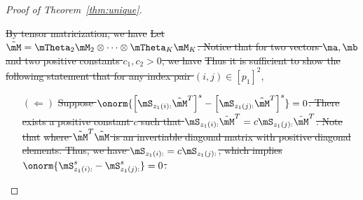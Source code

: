 \documentclass[lettersize,onecolumn,journal]{IEEEtran}
\theoremstyle{definition}
\theoremstyle{definition}
\newcommand{\of}[1]{\left(#1\right)}
\newcommand{\off}[1]{\left[#1\right]}
\providecommand{\DIFdeltex}[1]{{\protect\color{red}\sout{#1}}}                      %
\providecommand{\DIFdelbegin}{} %
\providecommand{\DIFdelend}{} %
\providecommand{\DIFdel}[1]{\texorpdfstring{\DIFdeltex{#1}}{}} %
\newcommand{\DIFscaledelfig}{0.5}
\newlength{\DIFdelgraphicswidth} %
\newlength{\DIFdelgraphicsheight} %
\newcommand{\DIFdelincludegraphics}[2][]{%
\sbox{\DIFdelgraphicsbox}{\DIFOincludegraphics[#1]{#2}}%
\settoboxwidth{\DIFdelgraphicswidth}{\DIFdelgraphicsbox} %
\settoboxtotalheight{\DIFdelgraphicsheight}{\DIFdelgraphicsbox} %
\scalebox{\DIFscaledelfig}{%
\parbox[b]{\DIFdelgraphicswidth}{\usebox{\DIFdelgraphicsbox}\\[-\baselineskip] \rule{\DIFdelgraphicswidth}{0em}}\llap{\resizebox{\DIFdelgraphicswidth}{\DIFdelgraphicsheight}{%
\setlength{\unitlength}{\DIFdelgraphicswidth}%
\begin{picture}(1,1)%
\thicklines\linethickness{2pt} %
{\color[rgb]{1,0,0}\put(0,0){\framebox(1,1){}}}%
{\color[rgb]{1,0,0}\put(0,0){\line( 1,1){1}}}%
{\color[rgb]{1,0,0}\put(0,1){\line(1,-1){1}}}%
\end{picture}%
}\hspace*{3pt}}} %
} %
\DeclareRobustCommand{\DIFdelbegin}{\DIFOdelbegin \let\includegraphics\DIFdelincludegraphics} %
\DeclareRobustCommand{\DIFdelend}{\DIFOaddend \let\includegraphics\DIFOincludegraphics} %
\begin{document}
\begin{proof}[Proof of Theorem~\ref{thm:unique}]
\begin{enumerate}[wide]
\DIFdel{By tensor matricization, we have
}%
\DIFdel{Let $\tilde \mM = \mTheta_2 \mM_2 \otimes \cdots \otimes \mTheta_K \mM_K$. Notice that for two vectors $\ma, \mb$ and two positive constants $c_1, c_2 >0$, we have
}%
\DIFdel{Thus it is sufficient to show the following statement that for any index pair $(i,j)\in[p_1]^2$}\DIFdelend ,\DIFdelbegin %
\begin{enumerate}%
\item[\DIFdel{$(\Leftarrow)$}]%
\DIFdel{Suppose $\onorm{ \off{\mS_{z_1(i):} \tilde \mM^T }^s - \off{\mS_{z_1(j):}\tilde \mM^T}^s} = 0$. There exists a positive constant $c$ such that $\mS_{z_1(i):} \tilde \mM^T= c \mS_{z_1(j):} \tilde \mM^T$. Note that
}%
\DIFdel{where $ \tilde \mM^T  \tilde \mM$ is an invertiable diagonal matrix with positive diagonal elements. Thus, we have $ \mS_{z_1(i):} = c  \mS_{z_1(j):}$, which implies $ \onorm{  \mS_{z_1(i):}^s -  \mS_{z_1(j):}^s } = 0 $.
}%


\end{enumerate}
\end{enumerate}
\end{proof}
\end{document}
